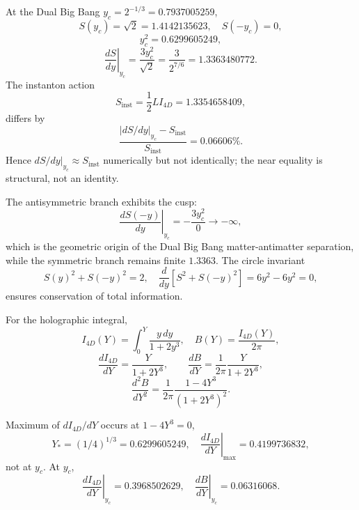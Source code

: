 \documentclass[12pt,oneside,openany]{book}
\begin{document}
At the Dual Big Bang $y_c=2^{-1/3}=0.7937005259$,
\begin{equation}
S(y_c)=\sqrt2=1.4142135623,\quad S(-y_c)=0,
\end{equation}
\begin{equation}
y_c^2 =0.6299605249,
\end{equation}
\begin{equation}
\left.\frac{dS}{dy}\right|_{y_c}= \frac{3y_c^2}{\sqrt2}= \frac{3}{2^{7/6}}=1.3363480772.
\label{eq:dSdy-yc}
\end{equation}
The instanton action
\begin{equation}
S_{\mathrm{inst}}=\frac12 L I_{4D}=1.3354658409,
\end{equation}
differs by
\begin{equation}
\frac{|dS/dy|_{y_c}-S_{\mathrm{inst}}}{S_{\mathrm{inst}}}=0.06606\%.
\label{eq:diff-Sinst}
\end{equation}
Hence $dS/dy|_{y_c}\approx S_{\mathrm{inst}}$ numerically but not identically;
the near equality is structural, not an identity.

The antisymmetric branch exhibits the cusp:
\begin{equation}
\boxed{\left.\frac{dS(-y)}{dy}\right|_{y_c}= -\frac{3y_c^2}{0}\to -\infty},
\label{eq:cusp}
\end{equation}
which is the geometric origin of the Dual Big Bang
matter-antimatter separation, while the symmetric branch remains
finite $1.3363$. The circle invariant
\begin{equation}
S(y)^2+S(-y)^2=2,\quad \frac{d}{dy}[S^2+S(-y)^2]=6y^2-6y^2=0,
\end{equation}
ensures conservation of total information.

For the holographic integral,
\begin{equation}
I_{4D}(Y)=\int_0^Y\frac{y\,dy}{1+2y^3},\quad B(Y)=\frac{I_{4D}(Y)}{2\pi},
\end{equation}
\begin{equation}
\boxed{\frac{dI_{4D}}{dY}= \frac{Y}{1+2Y^3}},\qquad
\boxed{\frac{dB}{dY}= \frac{1}{2\pi}\frac{Y}{1+2Y^3}},
\label{eq:dBdy}
\end{equation}
\begin{equation}
\boxed{\frac{d^2B}{dY^2}= \frac{1}{2\pi}\frac{1-4Y^3}{(1+2Y^3)^2}}.
\label{eq:d2Bdy2}
\end{equation}

Maximum of $dI_{4D}/dY$ occurs at $1-4Y^3=0$,
\begin{equation}
Y_*=(1/4)^{1/3}=0.6299605249,\quad \left.\frac{dI_{4D}}{dY}\right|_{\max}=0.4199736832,
\end{equation}
not at $y_c$. At $y_c$,
\begin{equation}
\left.\frac{dI_{4D}}{dY}\right|_{y_c}=0.3968502629,\quad
\left.\frac{dB}{dY}\right|_{y_c}=0.06316068.
\end{equation}
\end{document}
